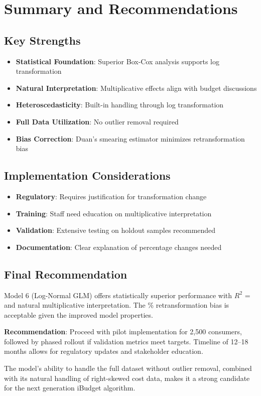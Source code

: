 \section{Summary and Recommendations}

\subsection{Key Strengths}

\begin{itemize}
    \item \textbf{Statistical Foundation}: Superior Box-Cox analysis supports log transformation
    \item \textbf{Natural Interpretation}: Multiplicative effects align with budget discussions
    \item \textbf{Heteroscedasticity}: Built-in handling through log transformation
    \item \textbf{Full Data Utilization}: No outlier removal required
    \item \textbf{Bias Correction}: Duan's smearing estimator minimizes retransformation bias
\end{itemize}

\subsection{Implementation Considerations}

\begin{itemize}
    \item \textbf{Regulatory}: Requires justification for transformation change
    \item \textbf{Training}: Staff need education on multiplicative interpretation
    \item \textbf{Validation}: Extensive testing on holdout samples recommended
    \item \textbf{Documentation}: Clear explanation of percentage changes needed
\end{itemize}

\subsection{Final Recommendation}

Model 6 (Log-Normal GLM) offers statistically superior performance with $R^2$ = \ModelSixRSquaredTest{} and natural multiplicative interpretation. The \ModelSixSmearingBias{}\% retransformation bias is acceptable given the improved model properties. 

\textbf{Recommendation}: Proceed with pilot implementation for 2,500 consumers, followed by phased rollout if validation metrics meet targets. Timeline of 12--18 months allows for regulatory updates and stakeholder education.

The model's ability to handle the full dataset without outlier removal, combined with its natural handling of right-skewed cost data, makes it a strong candidate for the next generation iBudget algorithm.